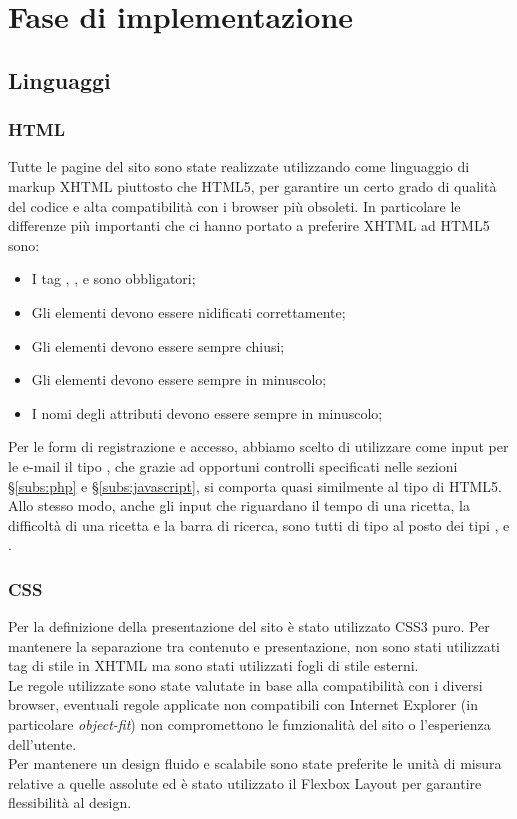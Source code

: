 \section{Fase di implementazione}
\label{sec:fase_di_implementazione}
\subsection{Linguaggi}
\subsubsection{HTML}
Tutte le pagine del sito sono state realizzate utilizzando come linguaggio di markup XHTML piuttosto che HTML5, per garantire un certo grado di qualità del codice e alta compatibilità con i browser più obsoleti. In particolare le differenze più importanti che ci hanno portato a preferire XHTML ad HTML5 sono:
\begin{itemize}
	\item I tag , ,  e  sono obbligatori;
	\item Gli elementi devono essere nidificati correttamente;
	\item Gli elementi devono essere sempre chiusi;
	\item Gli elementi devono essere sempre in minuscolo;
	\item I nomi degli attributi devono essere sempre in minuscolo;
\end{itemize}
Per le form di registrazione e accesso, abbiamo scelto di utilizzare come input per le e-mail il tipo , che grazie ad opportuni controlli specificati nelle sezioni \S\ref{subs:php} e \S\ref{subs:javascript}, si comporta quasi similmente al tipo  di HTML5. Allo stesso modo, anche gli input che riguardano il tempo di una ricetta, la difficoltà di una ricetta e la barra di ricerca, sono tutti di tipo  al posto dei tipi ,  e .

\subsubsection{CSS}
Per la definizione della presentazione del sito è stato utilizzato CSS3 puro. Per mantenere la separazione tra contenuto e presentazione, non sono stati utilizzati tag di stile in XHTML ma sono stati utilizzati fogli di stile esterni. \\
Le regole utilizzate sono state valutate in base alla compatibilità con i diversi browser, eventuali regole applicate non compatibili con Internet Explorer (in particolare \textit{object-fit}) non compromettono le funzionalità del sito o l'esperienza dell'utente. \\
Per mantenere un design fluido e scalabile sono state preferite le unità di misura relative a quelle assolute ed è stato utilizzato il Flexbox Layout per garantire flessibilità al design.

